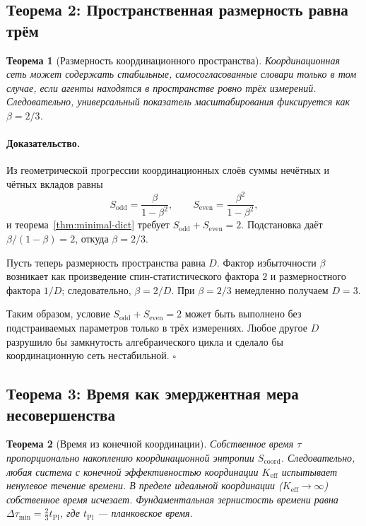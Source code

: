 \documentclass[12pt,a4paper]{article}
\newtheorem{theorem}{Теорема}[section]
\theoremstyle{remark}
\renewenvironment{proof}{\paragraph{Доказательство.}}{\hfill$\square$}
\newcommand{\tPl}{t_{\mathrm{Pl}}}
\newcommand{\Scoord}{S_{\mathrm{coord}}}
\begin{document}
	\subsection{Теорема 2: Пространственная размерность равна трём}
	
	\begin{theorem}[Размерность координационного пространства]
		\label{thm:dimension}
		Координационная сеть может содержать стабильные, самосогласованные словари только в том случае, если агенты находятся в пространстве ровно трёх измерений. Следовательно, универсальный показатель масштабирования фиксируется как \(\beta = 2/3\).
	\end{theorem}
	
	\begin{proof}
		Из геометрической прогрессии координационных слоёв суммы нечётных и чётных вкладов равны
		\[
		S_{\mathrm{odd}} = \frac{\beta}{1-\beta^2}, \qquad
		S_{\mathrm{even}} = \frac{\beta^2}{1-\beta^2},
		\]
		и теорема~\ref{thm:minimal-dict} требует \(S_{\mathrm{odd}} + S_{\mathrm{even}} = 2\). Подстановка даёт \(\beta/(1-\beta) = 2\), откуда \(\beta = 2/3\).
		
		Пусть теперь размерность пространства равна \(D\). Фактор избыточности \(\beta\) возникает как произведение спин-статистического фактора \(2\) и размерностного фактора \(1/D\); следовательно, \(\beta = 2/D\). При \(\beta = 2/3\) немедленно получаем \(D = 3\).
		
		Таким образом, условие \(S_{\mathrm{odd}} + S_{\mathrm{even}} = 2\) может быть выполнено без подстраиваемых параметров только в трёх измерениях. Любое другое \(D\) разрушило бы замкнутость алгебраического цикла и сделало бы координационную сеть нестабильной.
	\end{proof}
	
	\subsection{Теорема 3: Время как эмерджентная мера несовершенства}
	
	\begin{theorem}[Время из конечной координации]
		\label{thm:time}
		Собственное время \(\tau\) пропорционально накоплению координационной энтропии \(\Scoord\). Следовательно, любая система с конечной эффективностью координации \(K_{\mathrm{eff}}\) испытывает ненулевое течение времени. В пределе идеальной координации (\(K_{\mathrm{eff}} \to \infty\)) собственное время исчезает. Фундаментальная зернистость времени равна \(\Delta \tau_{\min} = \frac{2}{3} \tPl\), где \(\tPl\) --- планковское время.
	\end{theorem}
	
\end{document}

